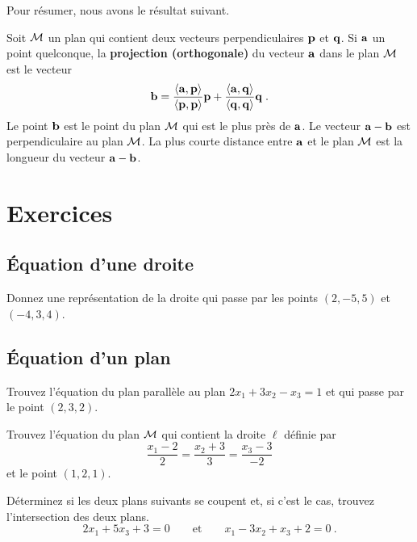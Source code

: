 {Pour résumer, nous avons le résultat suivant.

\begin{defn} 
Soit $\cal M$ un plan qui contient deux vecteurs perpendiculaires
$\mathbf{p}$ et $\mathbf{q}$.  Si $\mathbf{a}$ un point quelconque, la
{\bfseries projection (orthogonale)} du vecteur $\mathbf{a}$ dans le plan
$\cal M$ est le vecteur
\[
\mathbf{b} =  \frac{\left\langle{\mathbf{a}} , {\mathbf{p}}\right\rangle}{\left\langle{\mathbf{p}} , {\mathbf{p}}\right\rangle} \mathbf{p}
+ \frac{\left\langle{\mathbf{a}} , {\mathbf{q}}\right\rangle}{\left\langle{\mathbf{q}} , {\mathbf{q}}\right\rangle} \mathbf{q} \; .
\]
Le point $\mathbf{b}$ est le point du plan $\cal M$ qui est le plus près
de $\mathbf{a}$.  Le vecteur $\mathbf{a}-\mathbf{b}$ est perpendiculaire au
plan $\cal M$.  La plus courte distance entre $\mathbf{a}$ et le plan
$\cal M$ est la longueur du vecteur $\mathbf{a}-\mathbf{b}$.
\end{defn}

}  %

\section{Exercices}

\subsection{Équation d'une droite}

\begin{question}
Donnez une représentation de la droite qui passe par les points
$(2,-5,5)$ et $(-4,3,4)$.
\label{11Q1}\end{question}

\subsection{Équation d'un plan}

\begin{question}
Trouvez l'équation du plan parallèle au plan $2x_1 + 3x_2 - x_3 = 1$ et qui
passe par le point $(2,3,2)$.
\label{11Q2}
\end{question}

\begin{question}
Trouvez l'équation du plan $\cal M$ qui contient la droite $\ell$
définie par
\[
  \frac{x_1-2}{2} = \frac{x_2+3}{3} = \frac{x_3-3}{-2}
\]
et le point $(1,2,1)$.
\label{11Q3}
\end{question}

\begin{question}
Déterminez si les deux plans suivants se coupent et, si c'est le cas,
trouvez l'intersection des deux plans.
\[
 2x_1 + 5x_3  + 3 = 0 \qquad \text{et}  \qquad x_1 - 3x_2 + x_3 + 2 = 0 \ .
\]
\label{11Q4}
\end{question}

